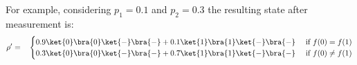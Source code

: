 
  For example, considering $p_1=0.1$ and $p_2=0.3$ the resulting state after measurement is:
  \begin{equation}
  \begin{split}
    \rho'=\quad &
    \begin{cases}
     0.9 \ket{0} \bra{0}\ket{-} \bra{-} + 0.1 \ket{1} \bra{1} \ket{-} \bra{-}  &\text{ if }   f(0)= f(1) \\
     0.3 \ket{0} \bra{0} \ket{-} \bra{-} + 0.7 \ket{1} \bra{1} \ket{-} \bra{-} &\text{ if }   f(0) \neq f(1) 
    \end{cases} \\
  \end {split}
  \end{equation}
  
